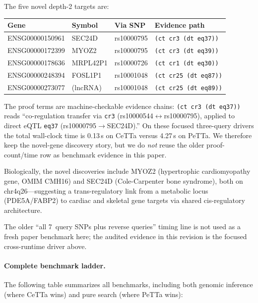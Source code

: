 \documentclass[11pt]{article}
\newcommand{\code}[1]{\texttt{#1}}
\newcommand{\PeTTa}{\textup{PeTTa}}
\newcommand{\CeTTa}{\textup{CeTTa}}
\begin{document}
The five novel depth-2 targets are:

\begin{center}
\begin{tabular}{llll}
\toprule
Gene & Symbol & Via SNP & Evidence path \\
\midrule
ENSG00000150961 & SEC24D  & rs10000795 & \code{(ct cr3 (dt eq37))} \\
ENSG00000172399 & MYOZ2   & rs10000795 & \code{(ct cr3 (dt eq39))} \\
ENSG00000178636 & MRPL42P1 & rs10000726 & \code{(ct cr1 (dt eq30))} \\
ENSG00000248394 & FOSL1P1  & rs10001048 & \code{(ct cr25 (dt eq87))} \\
ENSG00000273077 & (lncRNA)  & rs10001048 & \code{(ct cr25 (dt eq89))} \\
\bottomrule
\end{tabular}
\end{center}

The proof terms are machine-checkable evidence chains: \code{(ct cr3
(dt eq37))} reads ``co-regulation transfer via \code{cr3}
(rs10000544$\leftrightarrow$rs10000795), applied to direct eQTL
\code{eq37} (rs10000795$\to$SEC24D).''  On these focused three-query
drivers the total wall-clock time is 0.13\,s on \CeTTa{} versus
4.27\,s on \PeTTa{}.  We therefore keep the novel-gene discovery story,
but we do \emph{not} reuse the older proof-count/time row as benchmark
evidence in this paper.

Biologically, the novel discoveries include MYOZ2 (hypertrophic
cardiomyopathy gene, OMIM CMH16) and SEC24D (Cole-Carpenter bone
syndrome), both on chr4q26---suggesting a trans-regulatory link from a
metabolic locus (PDE5A/FABP2) to cardiac and skeletal gene targets via
shared cis-regulatory architecture.

The older ``all 7~query SNPs plus reverse queries'' timing line is not
used as a fresh paper benchmark here; the audited evidence in this
revision is the focused cross-runtime driver above.

\paragraph{Complete benchmark ladder.}
The following table summarizes all benchmarks, including both genomic
inference (where \CeTTa{} wins) and pure search (where \PeTTa{} wins):
\end{document}
